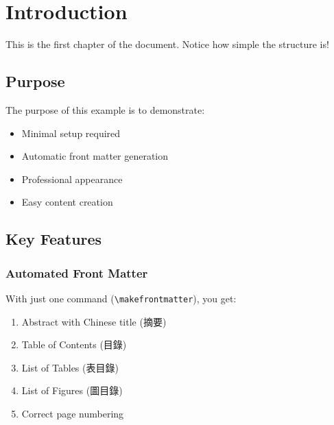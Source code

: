 \documentclass[12pt,a4paper]{gimmatek-report-template}
\begin{document}
\frontmatter
{}
\makefrontmatter  %

\mainmatter

\chapter{Introduction}

This is the first chapter of the document. Notice how simple the structure is!

\section{Purpose}

The purpose of this example is to demonstrate:

\begin{itemize}
\item Minimal setup required
\item Automatic front matter generation
\item Professional appearance
\item Easy content creation
\end{itemize}

\section{Key Features}

\subsection{Automated Front Matter}

With just one command (\texttt{\textbackslash makefrontmatter}), you get:

\begin{enumerate}
\item Abstract with Chinese title (摘要)
\item Table of Contents (目錄)
\item List of Tables (表目錄)
\item List of Figures (圖目錄)
\item Correct page numbering
\end{enumerate}
\end{document}
